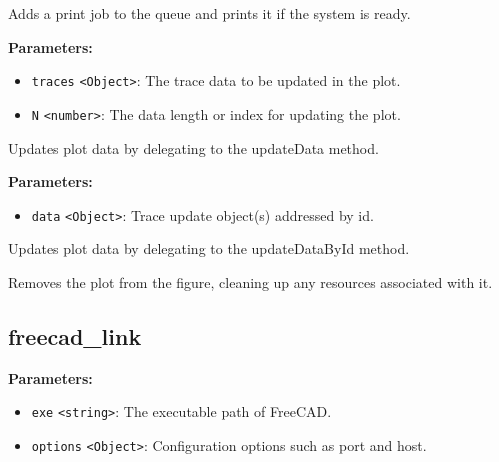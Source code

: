 \documentclass[12pt,a4paper]{article}
\begin{document}
\noindent Adds a print job to the queue and prints it if the system is ready.

\vspace{5mm}
\noindent {}


\noindent \textbf{Parameters:}
\begin{itemize}
  \item \texttt{traces} \texttt{<Object>}: The trace data to be updated in the plot.
  \item \texttt{N} \texttt{<number>}: The data length or index for updating the plot.
\end{itemize}

\noindent Updates plot data by delegating to the \textasciigrave{}updateData\textasciigrave{} method.

\vspace{5mm}
\noindent {}


\noindent \textbf{Parameters:}
\begin{itemize}
  \item \texttt{data} \texttt{<Object>}: Trace update object(s) addressed by \textasciigrave{}id\textasciigrave{}.
\end{itemize}

\noindent Updates plot data by delegating to the \textasciigrave{}updateDataById\textasciigrave{} method.

\vspace{5mm}
\noindent {}


\noindent Removes the plot from the figure, cleaning up any resources associated with it.


\subsection{freecad\_link}
\vspace{5mm}
\noindent {}


\noindent \textbf{Parameters:}
\begin{itemize}
  \item \texttt{exe} \texttt{<string>}: The executable path of FreeCAD.
  \item \texttt{options} \texttt{<Object>}: Configuration options such as port and host.
\end{itemize}
\end{document}
